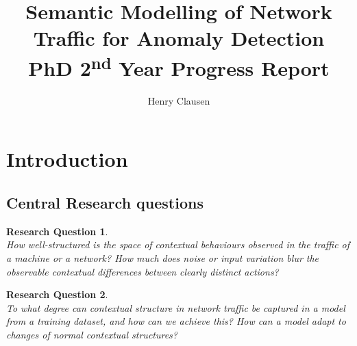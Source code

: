 \documentclass[a4paper,12pt,twoside]{article}
\makeatletter
\newcommand*{\toccontents}{\@starttoc{toc}}
\newtheorem{rquestion}{Research Question}
\makeatother
\begin{document}
\title{\LARGE {\bf Semantic Modelling of Network Traffic for Anomaly Detection}\\
PhD 2\textsuperscript{nd} Year Progress Report
 \vspace*{-5mm}
}
\author{Henry Clausen}

\maketitle



\toccontents


\section{Introduction}

\subsection{Central Research questions}

\begin{rquestion}\ \\ 
How well-structured is the space of contextual behaviours observed in the traffic of a machine or a network? How much does noise or input variation blur the observable contextual differences between clearly distinct actions?

\end{rquestion}



\begin{rquestion}\ \\
To what degree can contextual structure in network traffic be captured in a model from a training dataset, and how can we achieve this? How can a model adapt to changes of normal contextual structures?
\end{rquestion}
\end{document}
